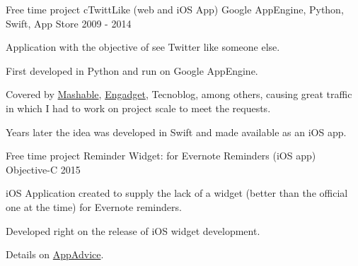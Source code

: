 

\begin{cventries}

\cventry
{Free time project} %
{cTwittLike (web and iOS App)} %
{Google AppEngine, Python, Swift, App Store} %
{2009 - 2014} %
{
  \begin{cvitems} %
    \item {Application with the objective of see Twitter like someone else.}
    \item {First developed in Python and run on Google AppEngine.}
    \item {Covered by \href{https://mashable.com/archive/ctwitterlike}{Mashable}, \href{https://www.engadget.com/2014-10-08-view-someone-elses-own-twitter-timeline-with-ctwittlike.html}{Engadget}, Tecnoblog, among others, causing great traffic in which I had to work on project scale to meet the requests.}
    \item {Years later the idea was developed in Swift and made available as an iOS app.}      
  \end{cvitems}
}


\cventry
{Free time project} %
{Reminder Widget: for Evernote Reminders (iOS app)} %
{Objective-C} %
{2015} %
{
\begin{cvitems} %
  \item {iOS Application created to supply the lack of a widget (better than the official one at the time) for Evernote reminders.}
  \item {Developed right on the release of iOS widget development.}
  \item {Details on \href{https://appadvice.com/app/reminder-widget-for-evernote-reminders/1000192150}{AppAdvice}.}
\end{cvitems}
}



\end{cventries}
